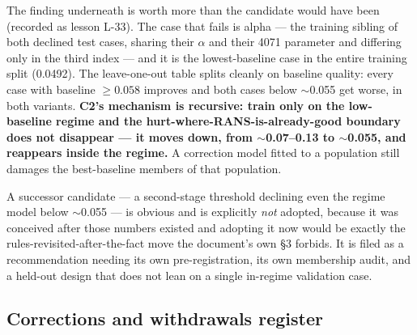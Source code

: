 \documentclass[11pt,a4paper]{article}
\newcommand{\breakus}{\textunderscore\allowbreak}
\newcommand{\code}[1]{{\small\ttfamily\let\_\breakus #1}}
\begin{document}
The finding underneath is worth more than the candidate would have been (recorded as lesson
L-33). The case that fails is \code{alpha\_05\_4071\_3036} --- the training sibling of both
declined test cases, sharing their $\alpha$ and their 4071 parameter and differing only in
the third index --- and it is the lowest-baseline case in the entire training split
(0.0492). The leave-one-out table splits cleanly on baseline quality: every case with
baseline $\geq 0.058$ improves and both cases below $\sim$0.055 get worse, in both variants.
\textbf{C2's mechanism is recursive: train only on the low-baseline regime and the
hurt-where-RANS-is-already-good boundary does not disappear --- it moves down, from
$\sim$0.07--0.13 to $\sim$0.055, and reappears inside the regime.} A correction model fitted
to a population still damages the best-baseline members of that population.

A successor candidate --- a second-stage threshold declining even the regime model below
$\sim$0.055 --- is obvious and is explicitly \emph{not} adopted, because it was conceived
after those numbers existed and adopting it now would be exactly the
rules-revisited-after-the-fact move the document's own \S3 forbids. It is filed as a
recommendation needing its own pre-registration, its own membership audit, and a held-out
design that does not lean on a single in-regime validation case.

\subsection{Corrections and withdrawals register}
\end{document}
